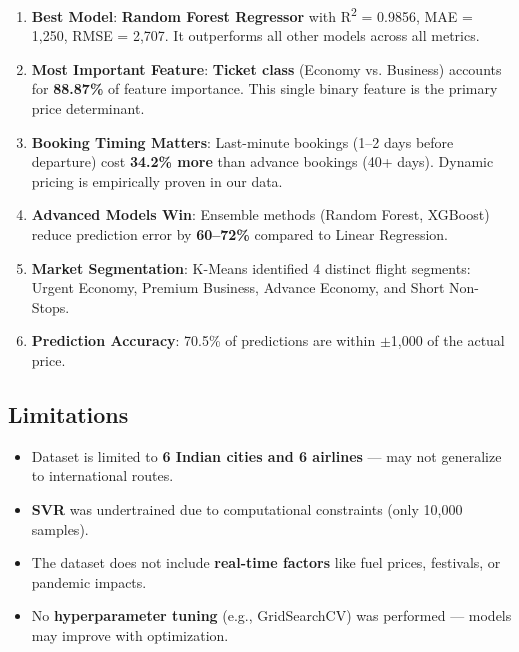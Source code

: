 \documentclass[12pt, a4paper]{article}
\newcommand{\rupee}{\text{₹}}
\begin{document}
\begin{enumerate}[leftmargin=*]
    \item \textbf{Best Model}: \textbf{Random Forest Regressor} with R\textsuperscript{2} = 0.9856, MAE = \rupee1,250, RMSE = \rupee2,707. It outperforms all other models across all metrics.
    
    \item \textbf{Most Important Feature}: \textbf{Ticket class} (Economy vs. Business) accounts for \textbf{88.87\%} of feature importance. This single binary feature is the primary price determinant.
    
    \item \textbf{Booking Timing Matters}: Last-minute bookings (1--2 days before departure) cost \textbf{34.2\% more} than advance bookings (40+ days). Dynamic pricing is empirically proven in our data.
    
    \item \textbf{Advanced Models Win}: Ensemble methods (Random Forest, XGBoost) reduce prediction error by \textbf{60--72\%} compared to Linear Regression.
    
    \item \textbf{Market Segmentation}: K-Means identified 4 distinct flight segments: Urgent Economy, Premium Business, Advance Economy, and Short Non-Stops.
    
    \item \textbf{Prediction Accuracy}: 70.5\% of predictions are within $\pm$\rupee1,000 of the actual price.
\end{enumerate}

\subsection{Limitations}

\begin{itemize}[leftmargin=*]
    \item Dataset is limited to \textbf{6 Indian cities and 6 airlines} — may not generalize to international routes.
    \item \textbf{SVR} was undertrained due to computational constraints (only 10,000 samples).
    \item The dataset does not include \textbf{real-time factors} like fuel prices, festivals, or pandemic impacts.
    \item No \textbf{hyperparameter tuning} (e.g., GridSearchCV) was performed — models may improve with optimization.
\end{itemize}
\end{document}
